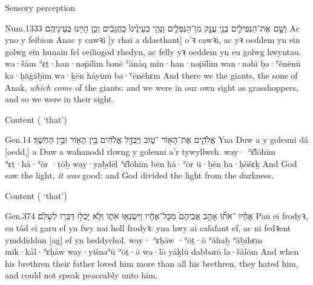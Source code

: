 \begin{frame}{Sensory perception}
	\begin{example}{Num.}{13}{33}{}{}
		\quoling
		{וְשָׁ֣ם  אֶת־הַנְּפִילִ֛ים בְּנֵ֥י עֲנָ֖ק מִן־הַנְּפִלִ֑ים וַנְּהִ֤י בְעֵינֵ֙ינוּ֙ כַּֽחֲגָבִ֔ים וְכֵ֥ן הָיִ֖ינוּ בְּעֵינֵיהֶֽם׃}
		{Ac yno y  feibion Anac y cawꝛi [y rhai a ddaethant] o’ꝛ cawꝛi, ac yꝛ oeddem yn ein golwg ein hunain fel ceiliogod rhedyn, ac felly yꝛ oeddem yn eu golwg hwyntau.}
		{wə·šåm  ʾɛṯ·han·nəp̄īlīm bənē ʿănåq min·han·nəp̄īlīm wan·nəhī ḇə·ʿēnēnū ka·ḥăḡåḇīm wə·ḵēn håyīnū bə·ʿēnēhɛm}
		{And there we  the giants, the sons of Anak, \emph{which come} of the giants: and we were in our own sight as grasshoppers, and so we were in their sight.}
	\end{example}
\end{frame}



\begin{frame}{Content ( ‘that’)}
	\begin{example}{Gen.}{1}{4}{}{}
		\quoling
		{ אֱלֹהִ֛ים אֶת־הָא֖וֹר ־ט֑וֹב וַיַּבְדֵּ֣ל אֱלֹהִ֔ים בֵּ֥ין הָא֖וֹר וּבֵ֥ין הַחֹֽשֶׁךְ׃}
		{Yna Duw a  y goleuni  dâ [oedd,] a Duw a wahanodd rhwng y goleuni a’r tywyllwch.}
		{way· ʾɛ̆lōhīm ʾɛṯ·hå·ʾōr ·ṭōḇ way·yaḇdēl ʾɛ̆lōhīm bēn hå·ʾōr ū·ḇēn ha·ḥōšɛḵ}
		{And God saw the light,  \emph{it was} good: and God divided the light from the darkness.}
	\end{example}
\end{frame}



\begin{frame}{Content ( ‘that’)}
	\begin{example}{Gen.}{37}{4}{}{}
		\quoling
		{ אֶחָ֗יו ־אֹת֞וֹ אָהַ֤ב אֲבִיהֶם֙ מִכָּל־אֶחָ֔יו וַֽיִּשְׂנְא֖וּ אֹת֑וֹ וְלֹ֥א יָכְל֖וּ דַּבְּר֥וֹ לְשָׁלֹֽם׃}
		{Pan  ei frodyꝛ,  eu tâd  ei garu ef yn fwy nai holl frodyꝛ: yna hwy ai caſaſant ef, ac ni fedꝛent ymddiddan [ag] ef yn heddychol.}
		{way· ʾɛḥåw ·ʾōṯ·ō ʾåhaḇ ʾăḇīhɛm mik·kål·ʾɛḥåw way·yiśnəʾū ʾōṯ·ō wə·lō yåḵlū dabbərō lə·šålōm}
		{And when his brethren   their father loved him more than all his brethren, they hated him, and could not speak peaceably unto him.}
	\end{example}
\end{frame}



